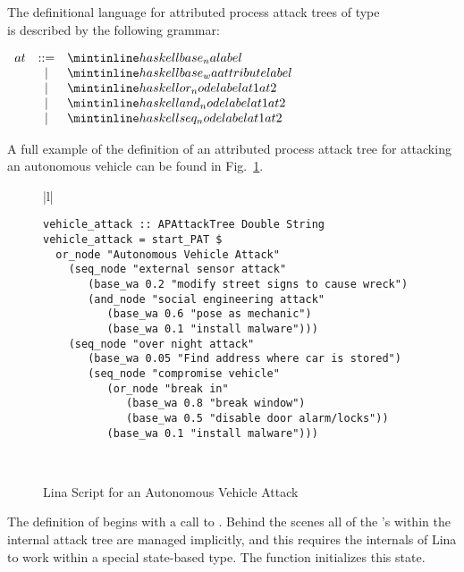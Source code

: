 The definitional language for attributed process attack trees of type \\
 is described by the following
grammar:
\begin{center}
  \footnotesize
  \begin{math}
    \begin{array}{lcl}
      at & ::=  & \mh{base_na label}\\
         & \mid & \mh{base_wa attribute label}\\
         & \mid & \mh{or_node label at1 at2}\\
         & \mid & \mh{and_node label at1 at2}\\
         & \mid & \mh{seq_node label at1 at2}\\
    \end{array}
  \end{math}
\end{center}
A full example of the definition of an attributed process attack tree
for attacking an autonomous vehicle can be found in
Fig.~\ref{fig:vehicle_attack}. 
\begin{figure}
      \begin{tabular}{|l|}
        \hline\\[-7px]
      \begin{minipage}{\textwidth}
        \begin{verbatim}
vehicle_attack :: APAttackTree Double String
vehicle_attack = start_PAT $
  or_node "Autonomous Vehicle Attack"
    (seq_node "external sensor attack"
       (base_wa 0.2 "modify street signs to cause wreck")
       (and_node "social engineering attack"
          (base_wa 0.6 "pose as mechanic")
          (base_wa 0.1 "install malware")))
    (seq_node "over night attack"
       (base_wa 0.05 "Find address where car is stored")
       (seq_node "compromise vehicle"
          (or_node "break in"
             (base_wa 0.8 "break window")
             (base_wa 0.5 "disable door alarm/locks"))
          (base_wa 0.1 "install malware")))
        \end{verbatim}
        \vspace{2px}
      \end{minipage} \\
      \hline
    \end{tabular}
  \caption{Lina Script for an Autonomous Vehicle Attack}
  \label{fig:vehicle_attack}
\end{figure}
The definition of  begins with a call to
.  Behind the scenes all of the 's within the
internal attack tree are managed implicitly, and this requires the
internals of Lina to work within a special state-based type.  The
function  initializes this state.


